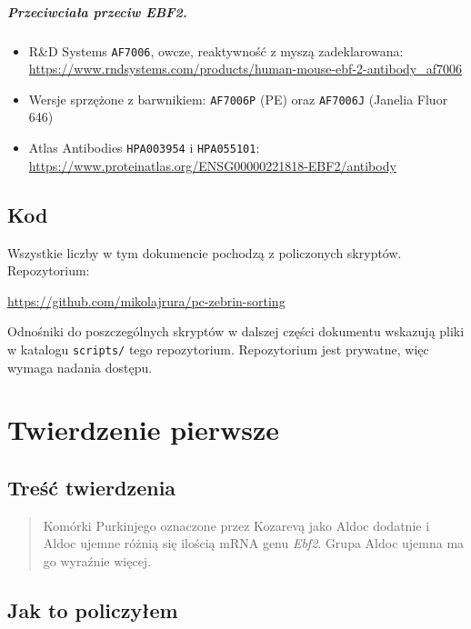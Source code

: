 \documentclass[a4paper,11pt]{report}
\begin{document}
\paragraph{Przeciwciała przeciw EBF2.}
\begin{itemize}
    \item R\&D Systems \texttt{AF7006}, owcze, reaktywność z myszą zadeklarowana:\\
          \url{https://www.rndsystems.com/products/human-mouse-ebf-2-antibody_af7006}
    \item Wersje sprzężone z barwnikiem: \texttt{AF7006P} (PE) oraz \texttt{AF7006J}
          (Janelia Fluor 646)
    \item Atlas Antibodies \texttt{HPA003954} i \texttt{HPA055101}:\\
          \url{https://www.proteinatlas.org/ENSG00000221818-EBF2/antibody}
\end{itemize}

\section{Kod}

Wszystkie liczby w tym dokumencie pochodzą z policzonych skryptów. Repozytorium:

\begin{center}
\url{https://github.com/mikolajrura/pc-zebrin-sorting}
\end{center}

Odnośniki do poszczególnych skryptów w dalszej części dokumentu wskazują pliki
w katalogu \texttt{scripts/} tego repozytorium. Repozytorium jest prywatne, więc
wymaga nadania dostępu.

\chapter{Twierdzenie pierwsze}

\section{Treść twierdzenia}

\begin{quote}
Komórki Purkinjego oznaczone przez Kozarevą jako Aldoc dodatnie i Aldoc ujemne
różnią się ilością mRNA genu \textit{Ebf2}. Grupa Aldoc ujemna ma go wyraźnie więcej.
\end{quote}

\section{Jak to policzyłem}
\end{document}
